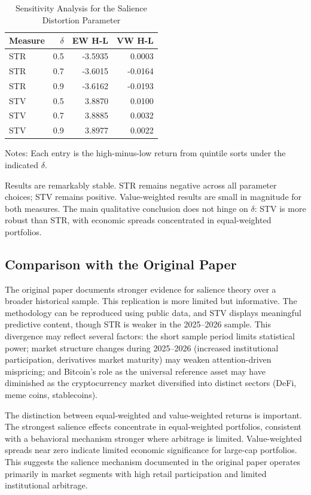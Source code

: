 \documentclass[11pt]{article}
\begin{document}
\begin{table}[htbp]
\centering
\small
\singlespacing
\caption{Sensitivity Analysis for the Salience Distortion Parameter}
\label{tab:delta}
\begin{tabular}{lrrr}
\toprule
Measure & $\delta$ & EW H-L & VW H-L \\
\midrule
STR & 0.5 & -3.5935 & 0.0003 \\
STR & 0.7 & -3.6015 & -0.0164 \\
STR & 0.9 & -3.6162 & -0.0193 \\
\midrule
STV & 0.5 & 3.8870 & 0.0100 \\
STV & 0.7 & 3.8885 & 0.0032 \\
STV & 0.9 & 3.8977 & 0.0022 \\
\bottomrule
\end{tabular}
\begin{flushleft}
\footnotesize Notes: Each entry is the high-minus-low return from quintile sorts under the indicated $\delta$.
\end{flushleft}
\end{table}

Results are remarkably stable. STR remains negative across all parameter choices; STV remains positive. Value-weighted results are small in magnitude for both measures. The main qualitative conclusion does not hinge on $\delta$: STV is more robust than STR, with economic spreads concentrated in equal-weighted portfolios.

\subsection{Comparison with the Original Paper}

The original paper documents stronger evidence for salience theory over a broader historical sample. This replication is more limited but informative. The methodology can be reproduced using public data, and STV displays meaningful predictive content, though STR is weaker in the 2025--2026 sample. This divergence may reflect several factors: the short sample period limits statistical power; market structure changes during 2025--2026 (increased institutional participation, derivatives market maturity) may weaken attention-driven mispricing; and Bitcoin's role as the universal reference asset may have diminished as the cryptocurrency market diversified into distinct sectors (DeFi, meme coins, stablecoins).

The distinction between equal-weighted and value-weighted returns is important. The strongest salience effects concentrate in equal-weighted portfolios, consistent with a behavioral mechanism stronger where arbitrage is limited. Value-weighted spreads near zero indicate limited economic significance for large-cap portfolios. This suggests the salience mechanism documented in the original paper operates primarily in market segments with high retail participation and limited institutional arbitrage.
\end{document}
